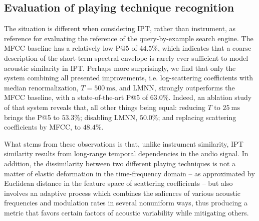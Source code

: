 \documentclass{article}
\makeatletter
\newcommand*{\ie}{i.e.\@\xspace}
\makeatother
\begin{document}
\subsection{Evaluation of playing technique recognition}

The situation is different when considering IPT, rather than instrument, as reference for evaluating the reference of the query-by-example search engine.
The MFCC baseline has a relatively low P@5 of $44.5\%$, which indicates that a coarse description of the short-term spectral envelope is rarely ever sufficient to model acoustic similarity in IPT.
Perhaps more surprisingly, we find that only the system combining all presented improvements, \ie{} log-scattering coefficients with median renormalization, $T=\SI{500}{\milli\second}$, and LMNN, strongly outperforms the MFCC baseline, with a state-of-the-art P@5 of $63.0\%$.
Indeed, an ablation study of that system reveals that, all other things being equal: reducing $T$ to $\SI{25}{\milli\second}$ brings the P@5 to $53.3\%$; disabling LMNN, $50.0\%$; and replacing scattering coefficients by MFCC, to $48.4\%$.

What stems from these observations is that, unlike instrument similarity, IPT similarity results from long-range temporal dependencies in the audio signal.
In addition, the dissimilarity between two different playing techniques is not a matter of elastic deformation in the time-frequency domain -- as approximated by Euclidean distance in the feature space of scattering coefficients -- but also involves an adaptive process which combines the saliences of various acoustic frequencies and modulation rates in several nonuniform ways, thus producing a metric that favors certain factors of acoustic variability while mitigating others.


\end{document}
